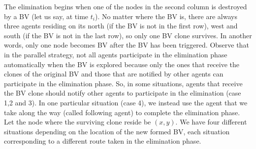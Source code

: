 The elimination begins when one of the nodes in the second column is destroyed by a BV (let us say, at time $t_i$). No matter where   the BV is, there are always three agents residing on its north (if the BV is not in the first row), west and south (if the BV is not in the last row), so only one BV clone survives. In another words, only one node becomes BV   after the BV has been triggered. Observe that in the parallel strategy, not all agents participate in the elimination phase automatically when the BV is explored because only the ones  that receive the clones of the original BV and those that are notified by other agents can participate in the elimination phase. So,  in some situations, agents that receive the BV clone should notify other agents to participate in the elimination (case 1,2 and 3). In one particular situation (case 4), we  instead use the agent  that we take along the way (called  following agent) to complete the elimination phase. Let the node where the surviving clone reside be $(x, y)$. We have four different situations   depending on the location of the new formed BV, each situation corresponding to a different route  taken in the elimination phase.

